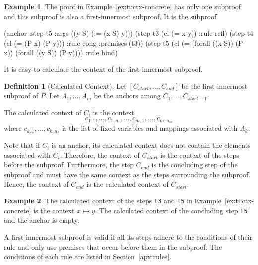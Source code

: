 \documentclass{scrartcl}
\theoremstyle{definition}
\newtheorem{example}{Example}
\newtheorem{definition}{Definition}[example]
\begin{document}
\begin{example}
The proof in Example~\ref{ex:ti:ctx-concrete} has only one subproof
and this subproof is also a first-innermost subproof.  It is the subproof
\begin{AletheVerb}
(anchor :step t5 :args ((y S) (:= (x S) y)))
(step t3 (cl (= x y)) :rule refl)
(step t4 (cl (= (P x) (P y))) :rule cong :premises (t3))
(step t5 (cl (= (forall ((x S)) (P x)) (forall ((y S)) (P y))))
                              :rule bind)
\end{AletheVerb}
\end{example}

\noindent
It is easy to calculate the context of the first-innermost subproof.

\begin{definition}[Calculated Context]
  Let $[C_{\mathit{start}}, \dots, C_{\mathit{end}}]$ be
  the first-innermost subproof of $P$.
  Let $A_1, \dots, A_m$ be the anchors among $C_1, \dots, C_{\mathit{start}-1}$.

  The calculated context of $C_i$ is the context
  \[
  c_{1,1}, \dots, c_{1, n_1}, \dots, c_{m,1}, \dots, c_{m, n_m}
  \]
  where $c_{k,1}, \dots, c_{k, n_k}$ is the list of fixed variables
  and mappings associated with $A_k$.
\end{definition}

Note that if $C_i$ is an anchor, its calculated context does not
contain the elements associated with $C_i$.
Therefore, the context of $C_{\mathit{start}}$
is the context of the steps before the subproof.
Furthermore, the step $C_{\mathit{end}}$ is the concluding
step of the subproof and must have the same context as the steps surrounding
the subproof.
Hence, the context of $C_{\mathit{end}}$ is the calculated
context of $C_{\mathit{start}}$.

\begin{example}
The calculated context of the steps \texttt{\color{SmtStepId}t3} and \texttt{\color{SmtStepId}t5} in
Example~\ref{ex:ti:ctx-concrete} is the context $x \mapsto y$.
The calculated context of the concluding step \texttt{\color{SmtStepId}t5} and the anchor is empty.
\end{example}

\noindent
A first-innermost subproof is valid if all its steps adhere to
the conditions of their rule and only use premises that occur before them
in the subproof.  The conditions of each rule are listed in
Section~\ref{apx:rules}.
\end{document}
